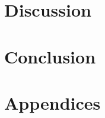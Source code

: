 \documentclass[a4paper,oneside,12pt]{book}
\begin{document}
\chapter{Discussion}


\chapter{Conclusion}


\backmatter
\renewcommand{\bibname}{References}
{}



\appendix
\chapter{Appendices}

\end{document}
